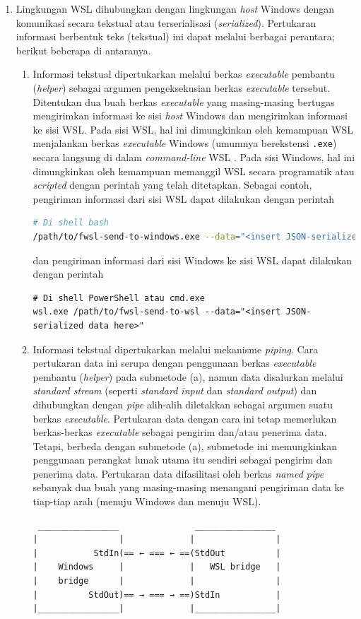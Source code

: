 \begin{enumerate}
    \item Lingkungan WSL dihubungkan dengan lingkungan \textit{host} Windows dengan komunikasi secara tekstual atau terserialisasi (\textit{serialized}). Pertukaran informasi berbentuk teks (tekstual) ini dapat melalui berbagai perantara; berikut beberapa di antaranya.
    \begin{enumerate}
        \item Informasi tekstual dipertukarkan melalui berkas \textit{executable} pembantu (\textit{helper}) sebagai argumen pengeksekusian berkas \textit{executable} tersebut. Ditentukan dua buah berkas \textit{executable} yang masing-masing bertugas mengirimkan informasi ke sisi \textit{host} Windows dan mengirimkan informasi ke sisi WSL. Pada sisi WSL, hal ini dimungkinkan oleh kemampuan WSL menjalankan berkas \textit{executable} Windows (umumnya berekstensi \verb|.exe|) secara langsung di dalam \textit{command-line} WSL \cite{msdocs-run-windows-tools-from-linux}. Pada sisi Windows, hal ini dimungkinkan oleh kemampuan memanggil WSL secara programatik atau \textit{scripted} dengan perintah yang telah ditetapkan. Sebagai contoh, pengiriman informasi dari sisi WSL dapat dilakukan dengan perintah
        \begin{lstlisting}[language=bash]
# Di shell bash
/path/to/fwsl-send-to-windows.exe --data="<insert JSON-serialized data here>"\end{lstlisting}
        dan pengiriman informasi dari sisi Windows ke sisi WSL dapat dilakukan dengan perintah
        \begin{lstlisting}
# Di shell PowerShell atau cmd.exe
wsl.exe /path/to/fwsl-send-to-wsl --data="<insert JSON-serialized data here>"\end{lstlisting}

        \item Informasi tekstual dipertukarkan melalui mekanisme \textit{piping}. Cara pertukaran data ini serupa dengan penggunaan berkas \textit{executable} pembantu (\textit{helper}) pada submetode (a), namun data disalurkan melalui \textit{standard stream} (seperti \textit{standard input} dan \textit{standard output}) dan dihubungkan dengan \textit{pipe} alih-alih diletakkan sebagai argumen suatu berkas \textit{executable}. Pertukaran data dengan cara ini tetap memerlukan berkas-berkas \textit{executable} sebagai pengirim dan/atau penerima data. Tetapi, berbeda dengan submetode (a), submetode ini memungkinkan penggunaan perangkat lunak utama itu sendiri sebagai pengirim dan penerima data. Pertukaran data difasilitasi oleh berkas \textit{named pipe} sebanyak dua buah yang masing-masing menangani pengiriman data ke tiap-tiap arah (menuju Windows dan menuju WSL).
        \begin{verbatim}
 ________________               ________________
|                |             |                |
|           StdIn(== ← === ← ==(StdOut          |
|    Windows     |             |   WSL bridge   |
|    bridge      |             |                |
|          StdOut)== → === → ==)StdIn           |
|________________|             |________________|


\end{verbatim}
\end{enumerate}
\end{enumerate}
